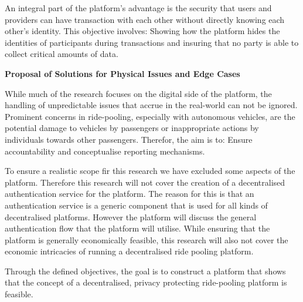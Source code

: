 An integral part of the platform's advantage is the security that users and providers can have transaction with each other without directly knowing each other's identity. This objective involves:
Showing how the platform hides the identities of participants during transactions and insuring that no party is able to collect critical amounts of data.


\textbf{Proposal of Solutions for Physical Issues and Edge Cases}

While much of the research focuses on the digital side of the platform, the handling of unpredictable issues that accrue in the real-world can not be ignored. Prominent concerns in ride-pooling, especially with autonomous vehicles, are the potential damage to vehicles by passengers or inappropriate actions by individuals towards other passengers. Therefor, the aim is to: Ensure accountability and conceptualise reporting mechanisms.

To ensure a realistic scope fir this research we have excluded some aspects of the platform. Therefore this research will not cover the creation of a decentralised authentication service for the platform. The reason for this is that an authentication service is a generic component that is used for all kinds of decentralised platforms. However the platform will discuss the general authentication flow that the platform will utilise. While ensuring that the platform is generally economically feasible, this research will also not cover the economic intricacies of running a decentralised ride pooling platform.

 Through the defined objectives, the goal is to construct a platform that shows that the concept of a decentralised, privacy protecting ride-pooling platform is feasible.